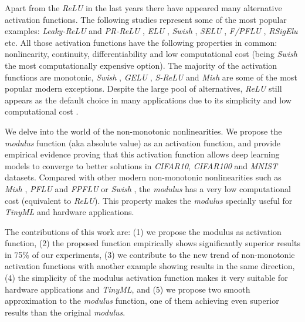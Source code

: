 Apart from the \textit{ReLU} in the last years there have appeared many alternative activation functions. The following studies represent some of the most popular examples: \textit{Leaky-ReLU} and \textit{PR-ReLU} \autocite{xu2015}, \textit{ELU} \autocite{djork2016}, \textit{Swish} \autocite{ramachandran2018}, \textit{SELU} \autocite{klambauer2017}, \textit{F/PFLU} \autocite{zhu2020}, \textit{RSigElu} \autocite{Kilicarslan2021} etc. All those activation functions have the following properties in common: nonlinearity, continuity, differentiability and low computational cost (being \textit{Swish} the most computationally expensive option). The majority of the activation functions are monotonic, \textit{Swish} \autocite{ramachandran2018}, \textit{GELU} \autocite{hendrycks2016},  \textit{S-ReLU} \autocite{Jin2016} and \textit{Mish} \autocite{misra2019mish} are some of the most popular modern exceptions. Despite the large pool of alternatives, \textit{ReLU} still appears as the default choice in many applications due to its simplicity and low computational cost \autocite{nair2010}.

We delve into the world of the non-monotonic nonlinearities. We propose the \textit{modulus} function (aka absolute value) as an activation function, and provide empirical evidence proving that this activation function allows deep learning models to converge to better solutions in \textit{CIFAR10}, \textit{CIFAR100} and \textit{MNIST} datasets. Compared with other modern non-monotonic nonlinearities such as \textit{Mish} \autocite{misra2019mish}, \textit{PFLU} and \textit{FPFLU} \autocite{zhu2020} or \textit{Swish}  \autocite{ramachandran2018}, the \textit{modulus} has a very low computational cost (equivalent to \textit{ReLU}). This property makes the \textit{modulus} specially useful for \textit{TinyML} \autocite{sanchez2020} and hardware \autocite{Misra2010} applications.

The contributions of this work are: (1) we propose the modulus as activation function, (2) the proposed function empirically shows significantly superior results in 75\% of our experiments, (3) we contribute to the new trend of non-monotonic activation functions with another example showing results in the same direction, (4) the simplicity of the modulus activation function makes it very suitable for hardware applications and \textit{TinyML}, and (5) we propose two smooth approximation to the \textit{modulus} function, one of them achieving even superior results than the original \textit{modulus}.

